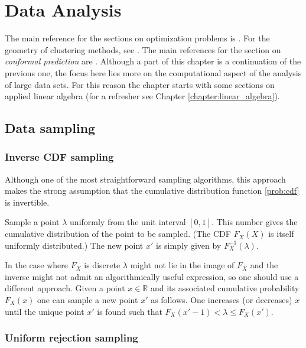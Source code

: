 \chapter{Data Analysis}

    The main reference for the sections on optimization problems is \cite{conjugategradient}. For the geometry of clustering methods, see \cite{clustering_bregman}. The main references for the section on \textit{conformal prediction} are \cite{cp, cp_all}. Although a part of this chapter is a continuation of the previous one, the focus here lies more on the computational aspect of the analysis of large data sets. For this reason the chapter starts with some sections on applied linear algebra (for a refresher see Chapter \ref{chapter:linear_algebra}).

\section{Data sampling}
\subsection{Inverse CDF sampling}

    Although one of the most straightforward sampling algorithms, this approach makes the strong assumption that the cumulative distribution function \ref{prob:cdf} is invertible.

    \begin{method}
        Sample a point $\lambda$ uniformly from the unit interval $[0,1]$. This number gives the cumulative distribution of the point to be sampled. (The CDF $F_X(X)$ is itself uniformly distributed.) The new point $x'$ is simply given by $F^{-1}_X(\lambda)$.

        In the case where $F_X$ is discrete $\lambda$ might not lie in the image of $F_X$ and the inverse might not admit an algorithmically useful expression, so one should use a different approach. Given a point $x\in\mathbb{R}$ and its associated cumulative probability $F_X(x)$ one can sample a new point $x'$ as follows. One increases (or decreases) $x$ until the unique point $x'$ is found such that $F_X(x'-1)<\lambda\leq F_X(x')$.
    \end{method}

\subsection{Uniform rejection sampling}

